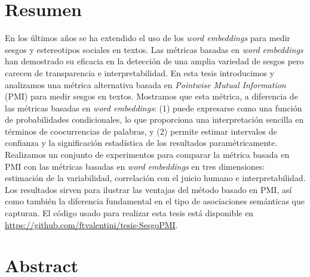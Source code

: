 
\chapter*{Resumen}

En los últimos años se ha extendido el uso de los \emph{word embeddings} para medir sesgos y estereotipos sociales en textos. Las métricas basadas en \emph{word embeddings} han demostrado su eficacia en la detección de una amplia variedad de sesgos pero carecen de transparencia e interpretabilidad. En esta tesis introducimos y analizamos una métrica alternativa basada en \emph{Pointwise Mutual Information} (PMI) para medir sesgos en textos. Mostramos que esta métrica, a diferencia de las métricas basadas en \emph{word embeddings}: (1) puede expresarse como una función de probabilidades condicionales, lo que proporciona una interpretación sencilla en términos de coocurrencias de palabras, y (2) permite estimar intervalos de confianza y la significación estadística de los resultados paramétricamente. Realizamos un conjunto de experimentos para comparar la métrica basada en PMI con las métricas basadas en \emph{word embeddings} en tres dimensiones: estimación de la variabilidad, correlación con el juicio humano e interpretabilidad. Los resultados sirven para ilustrar las ventajas del método basado en PMI, así como también la diferencia fundamental en el tipo de asociaciones semánticas que capturan. El código usado para realizar esta tesis está disponible en \url{https://github.com/ftvalentini/tesis-SesgoPMI}.


\vspace{1cm}

{\let\clearpage\relax\chapter*{Abstract}}

